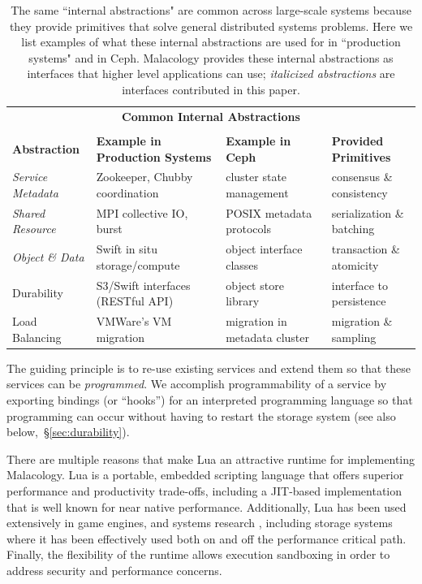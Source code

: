 \documentclass[preprint]{sigplanconf-eurosys}
\begin{document}
\begin{table}
\centering
\begin{tabular}{  l | l | l | l }
\multicolumn{4}{c}{\Large \textbf{Common Internal Abstractions}} \\
\multicolumn{4}{c}{} \\
\textbf{Abstraction}                    &
\textbf{Example in Production Systems}  &
\textbf{Example in Ceph}                &
\textbf{Provided Primitives}            \\ \hline
{\it Service Metadata}
  & Zookeeper, Chubby coordination~\cite{hunt_zookeeper_2010,website:chubby}
  & cluster state management~\cite{website:ceph-mon}
  & consensus \& consistency
  \\
{\it Shared Resource}
  & MPI collective IO, burst
  & POSIX metadata protocols~\cite{CITEME}
  & serialization \& batching
  \\
{\it Object \& Data}
  & Swift in situ storage/compute~\cite{website:zerocloud}
  & object interface classes~\cite{website:cls-lua}
  & transaction \& atomicity
  \\
Durability
  & S3/Swift interfaces (RESTful API)
  & object store library~\cite{weil_rados_2007}
  & interface to persistence
  \\
Load Balancing
  & VMWare's VM migration~\cite{vmware-drs,gulati:hotcloud2011-cloud-resource-management} 
  & migration in metadata cluster~\cite{weil:sc2004-dyn-metadata}
  & migration \& sampling
  \\
\end{tabular}
\caption{The same ``internal abstractions" are common across large-scale
systems because they provide primitives that solve general distributed systems
problems.  Here we list examples of what these internal abstractions are used
for in ``production systems" and in Ceph.  Malacology provides these internal
abstractions as interfaces that higher level applications can use; {\it
italicized abstractions} are interfaces contributed in this paper.}
\label{table:examples}
\end{table}

The guiding principle
is to re-use existing services and extend them so that these services can be
\emph{programmed}. We accomplish programmability of a service by exporting
bindings (or ``hooks'') for an interpreted programming language so that
programming can occur without having to restart the storage system (see also
below,~\S\ref{sec:durability}). 

There are multiple reasons that make Lua an attractive runtime for implementing
Malacology. Lua is a portable, embedded scripting language that offers superior
performance and productivity trade-offs, including a JIT-based implementation
that is well known for near native performance. Additionally, Lua has been used
extensively in game engines, and systems research \cite{neto:dls14-luaos},
including storage systems where it has been effectively used both on
\cite{grawinkel:pdsw2012-lua,watkins2013:bdmc13-in-vivo,geambasu_comet_2010}
and off \cite{sevilla:sc15-mantle} the performance critical path. Finally, the
flexibility of the runtime allows execution sandboxing in order to address
security and performance concerns.
\end{document}
